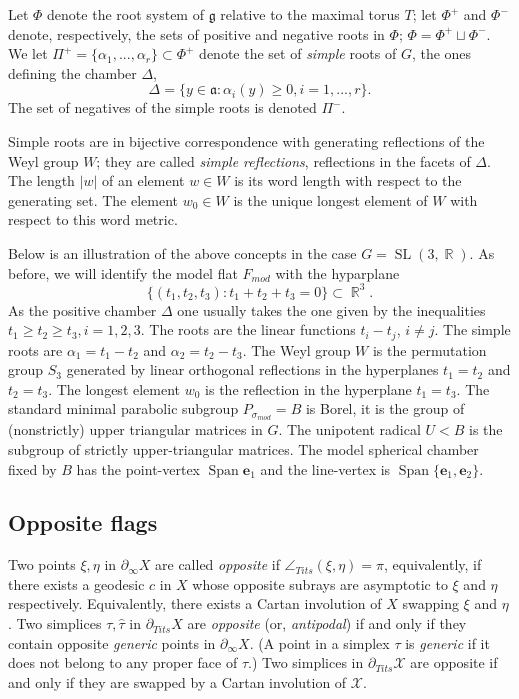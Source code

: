 \documentclass[12pt]{amsbook}%
\theoremstyle{definition}
\theoremstyle{remark}
\numberwithin{section}{chapter}
\numberwithin{subsection}{section}
\numberwithin{figure}{chapter}
\DeclareMathOperator{\SL}{SL}
\DeclareMathOperator{\R}{\mathbb{R}}
\def\tits{\partial_{Tits}}
\def\tangle{\angle_{Tits}}
\def\simod{\sigma_{mod}}
\def\Fmod{F_{mod}}
\def\cX{{\mathscr{X}}}
\def\al{\alpha}
\def\geo{\partial_\infty}
\def\Span{\operatorname{Span}}
\begin{document}
{{\medskip 
Let $\Phi$ denote the root system of ${\mathfrak g}$ relative to the maximal torus $T$; 
let $\Phi^+$ and $\Phi^-$ denote, respectively, the sets of positive and negative roots in $\Phi$; $\Phi=\Phi^+\sqcup \Phi^-$. We let 
$\Pi^+=\{\alpha_1,...,\alpha_r\}\subset \Phi^+$ denote the set of {\em simple} roots of $G$, the ones defining the chamber $\Delta$, 
$$
\Delta=\{y\in {\mathfrak a}: \alpha_i(y)\geqslant 0, i=1,...,r\}. 
$$
The set of negatives of the simple roots is denoted $\Pi^-$.

Simple roots are in bijective correspondence with generating reflections of the Weyl group $W$; they are called {\em simple reflections}, 
reflections in the facets of $\Delta$. The length $|w|$ of an element $w\in W$ is its word length with respect to the generating set. The 
element $w_0\in W$ is the unique longest element of $W$ with respect to this word metric. 

\medskip 
Below is an illustration of the above concepts in the case $G=\SL(3,\R)$. As before, we will identify the model flat $\Fmod$ with the hyparplane 
$$
\{(t_1, t_2, t_3): t_1+t_2+t_3=0\}\subset \R^3. 
$$
As the positive chamber $\Delta$ one usually takes the one given by the inequalities 
$t_1\geqslant t_2\geqslant t_3, i=1, 2, 3$. The roots are the linear functions $t_i-t_j$, $i\ne j$.  The simple roots are $\al_1=t_1-t_2$ and $\al_2=t_2-t_3$. 
The Weyl group $W$ is the permutation group $S_3$ generated by linear orthogonal reflections in the hyperplanes $t_1=t_2$ and $t_2=t_3$. The longest element $w_0$ is the reflection in the hyperplane $t_1=t_3$. The standard minimal parabolic subgroup $P_{\simod}=B$ 
is Borel, it is the group of (nonstrictly) upper triangular matrices in $G$. The unipotent radical $U< B$ is the subgroup of strictly upper-triangular matrices. The model 
spherical chamber fixed by $B$ has the point-vertex $\Span {\mathbf e}_1$ and the line-vertex is $\Span \{ {\mathbf e}_1, {\mathbf e}_2\}$. 




\subsection{Opposite flags}

Two points $\xi, \eta$ in $\geo X$ are called {\em opposite}
 if $\tangle(\xi, \eta)=\pi$, equivalently, if there exists a geodesic $c$ in $X$ whose opposite subrays are asymptotic to $\xi$ and $\eta$ respectively. Equivalently, there exists a Cartan involution of $X$ swapping $\xi$ and $\eta$. Two simplices $\tau, \hat\tau$ in $\tits X$ are 
 {\em opposite} (or, {\em antipodal}) if and only if they contain opposite {\em generic} points in $\geo X$. (A point in a simplex $\tau$ is {\em generic} if it does not belong to any proper face of $\tau$.) Two simplices in $\tits \cX$ are opposite  if and only if they are swapped by a Cartan involution of $\cX$. 

}}
\end{document}
